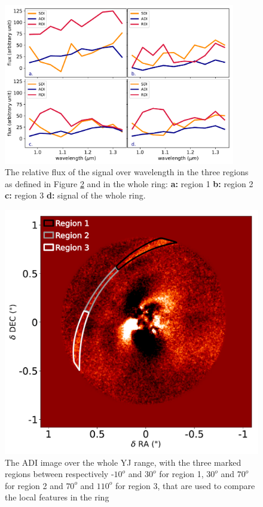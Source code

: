 \documentclass[twoside,single,12pt]{lion-msc}
\begin{document}
\begin{figure}[!t]
\centering
\vspace{-0.3cm}
\includegraphics[trim={0cm 0cm 0cm 0cm},clip,width = 0.9\textwidth]{colorregions}
\caption{The relative flux of the signal over wavelength in the three regions as defined in Figure \ref{fig:regions} and in the whole ring: \textbf{a:} region 1 \textbf{b:} region 2 \textbf{c:} region 3 \textbf{d:} signal of the whole ring.}
\label{fig:coloroverpos}
\vspace{-0.5cm}
\end{figure}

\begin{figure}
\vspace{-0mm}
\centering
\includegraphics[width=1\linewidth]{ADIregions}
\caption{The ADI image over the whole YJ range, with the three marked regions between respectively -$10^o$ and $30^o$ for region 1, $30^o$ and $70^o$ for region 2 and $70^o$ and $110^o$ for region 3, that are used to compare the local features in the ring}
\label{fig:regions}
\vspace{-9mm}
\end{figure}
\end{document}
